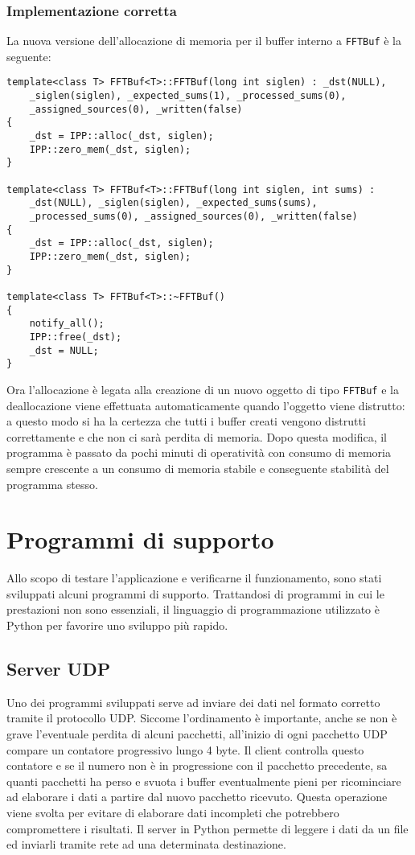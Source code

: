 \subsubsection{Implementazione corretta}
La nuova versione dell'allocazione di  memoria per il buffer interno a
\texttt{FFTBuf} \`e la seguente:
\begin{lstlisting}
template<class T> FFTBuf<T>::FFTBuf(long int siglen) : _dst(NULL),
    _siglen(siglen), _expected_sums(1), _processed_sums(0),
    _assigned_sources(0), _written(false)
{
    _dst = IPP::alloc(_dst, siglen);
    IPP::zero_mem(_dst, siglen);
}

template<class T> FFTBuf<T>::FFTBuf(long int siglen, int sums) :
    _dst(NULL), _siglen(siglen), _expected_sums(sums),
    _processed_sums(0), _assigned_sources(0), _written(false)
{
    _dst = IPP::alloc(_dst, siglen);
    IPP::zero_mem(_dst, siglen);
}

template<class T> FFTBuf<T>::~FFTBuf()
{
    notify_all();
    IPP::free(_dst);
    _dst = NULL;
}
\end{lstlisting}
Ora l'allocazione \`e legata alla creazione di un nuovo oggetto di tipo
\texttt{FFTBuf} e la deallocazione viene effettuata automaticamente quando
l'oggetto viene distrutto: a questo modo si ha la certezza che tutti i buffer
creati vengono distrutti correttamente e che non ci sar\`a perdita di memoria.
Dopo questa modifica, il programma \`e passato da pochi minuti di operativit\`a
con consumo di memoria sempre crescente a un consumo di memoria stabile e
conseguente stabilit\`a del programma stesso.

\section{Programmi di supporto}
Allo scopo di testare l'applicazione e verificarne il funzionamento, sono stati
sviluppati alcuni programmi di supporto. Trattandosi di programmi in cui le
prestazioni non sono essenziali, il linguaggio di programmazione utilizzato \`e
Python per favorire uno sviluppo pi\`u rapido.
\subsection{Server UDP}
Uno dei programmi sviluppati serve ad inviare dei dati nel formato corretto
tramite il protocollo UDP. Siccome l'ordinamento \`e importante,
anche se non \`e grave l'eventuale perdita di alcuni pacchetti, all'inizio di
ogni pacchetto UDP compare un contatore progressivo lungo 4 byte. Il client
controlla questo contatore e se il numero non \`e in progressione con il
pacchetto precedente, sa quanti pacchetti ha perso e svuota i buffer
eventualmente pieni per ricominciare ad elaborare i dati a partire dal nuovo
pacchetto ricevuto. Questa operazione viene svolta per evitare di elaborare dati
incompleti che potrebbero compromettere i risultati. Il server in Python
permette di leggere i dati da un file ed inviarli tramite rete ad una
determinata destinazione.
